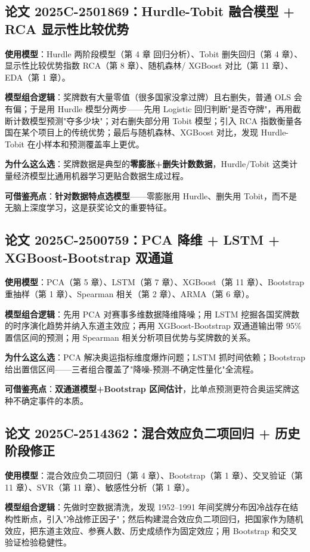 \subsection{论文 2025C-2501869：Hurdle-Tobit 融合模型 + RCA 显示性比较优势}
\textbf{使用模型}：Hurdle 两阶段模型（第 4 章 回归分析）、Tobit 删失回归（第 4 章）、显示性比较优势指数 RCA（第 8 章）、随机森林/ XGBoost 对比（第 11 章）、EDA（第 1 章）。

\textbf{模型组合逻辑}：奖牌数有大量零值（很多国家没拿过牌）且右删失，普通 OLS 会有偏；于是用 Hurdle 模型分两步——先用 Logistic 回归判断"是否夺牌"，再用截断计数模型预测"夺多少块"；对右删失部分用 Tobit 模型；引入 RCA 指数衡量各国在某个项目上的传统优势；最后与随机森林、XGBoost 对比，发现 Hurdle-Tobit 在小样本和预测覆盖率上更优。

\textbf{为什么这么选}：奖牌数据是典型的\textbf{零膨胀+删失计数数据}，Hurdle/Tobit 这类计量经济模型比通用机器学习更贴合数据生成过程。

\textbf{可借鉴亮点}：\textbf{针对数据特点选模型}——零膨胀用 Hurdle、删失用 Tobit，而不是无脑上深度学习，这是获奖论文的重要特征。

\subsection{论文 2025C-2500759：PCA 降维 + LSTM + XGBoost-Bootstrap 双通道}
\textbf{使用模型}：PCA（第 5 章）、LSTM（第 7 章）、XGBoost（第 11 章）、Bootstrap 重抽样（第 1 章）、Spearman 相关（第 2 章）、ARMA（第 6 章）。

\textbf{模型组合逻辑}：先用 PCA 对赛事多维数据降维降噪；用 LSTM 挖掘各国奖牌数的时序演化趋势并纳入东道主效应；再用 XGBoost-Bootstrap 双通道输出带 95\% 置信区间的预测；用 Spearman 相关分析项目优势与奖牌数的关系。

\textbf{为什么这么选}：PCA 解决奥运指标维度爆炸问题；LSTM 抓时间依赖；Bootstrap 给出置信区间——三者组合覆盖了"降噪-预测-不确定性量化"全流程。

\textbf{可借鉴亮点}：\textbf{双通道模型+Bootstrap 区间估计}，比单点预测更符合奥运奖牌这种不确定事件的本质。

\subsection{论文 2025C-2514362：混合效应负二项回归 + 历史阶段修正}
\textbf{使用模型}：混合效应负二项回归（第 4 章）、Bootstrap（第 1 章）、交叉验证（第 11 章）、SVR（第 11 章）、敏感性分析（第 1 章）。

\textbf{模型组合逻辑}：先做时空数据清洗，发现 1952--1991 年间奖牌分布因冷战存在结构性断点，引入"冷战修正因子"；然后构建混合效应负二项回归，把国家作为随机效应，把东道主效应、参赛人数、历史成绩作为固定效应；用 Bootstrap 和交叉验证检验稳健性。

